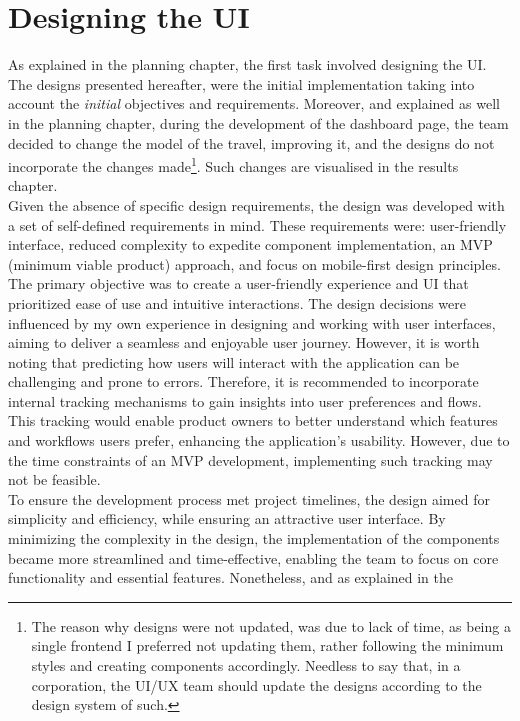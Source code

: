 \documentclass[./memory.tex]{subfiles}
\begin{document}
\section{Designing the UI}
As explained in the planning chapter, the first task involved designing the UI.
The designs presented hereafter, were the initial implementation taking into
account the \emph{initial} objectives and requirements. Moreover, and explained
as well in the planning chapter, during the development of the dashboard page,
the team decided to change the model of the travel, improving it, and the
designs do not incorporate the changes made\footnote{The reason why designs were
	not updated, was due to lack of time, as being a single frontend I preferred not
	updating them, rather following the minimum styles and creating components
	accordingly. Needless to say that, in a corporation, the UI/UX team should
	update the designs according to the design system of such.}. Such changes
are visualised in the results chapter.
\\[8pt]
Given the absence of specific design requirements, the design was developed with
a set of self-defined requirements in mind. These requirements were:
user-friendly interface, reduced complexity to expedite component
implementation, an MVP (minimum viable product) approach, and focus on
mobile-first design principles.
\\
The primary objective was to create a user-friendly experience and UI that
prioritized ease of use and intuitive interactions. The design decisions were
influenced by my own experience in designing and working with user interfaces,
aiming to deliver a seamless and enjoyable user journey. However, it is worth
noting that predicting how users will interact with the application can be
challenging and prone to errors. Therefore, it is recommended to incorporate
internal tracking mechanisms to gain insights into user preferences and flows.
This tracking would enable product owners to better understand which features
and workflows users prefer, enhancing the application's usability. However, due
to the time constraints of an MVP development, implementing such tracking may
not be feasible.
\\
To ensure the development process met project timelines, the design aimed for
simplicity and efficiency, while ensuring an attractive user interface. By
minimizing the complexity in the design, the implementation of the components
became more streamlined and time-effective, enabling the team to focus on core
functionality and essential features. Nonetheless, and as explained in the
\end{document}
